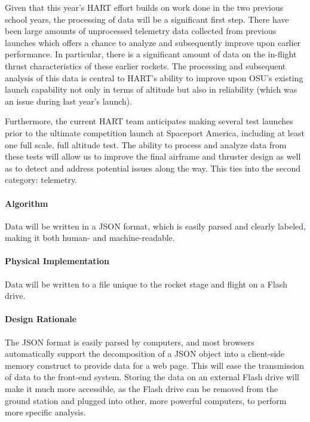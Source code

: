 \documentclass[journal,10pt,onecolumn,compsoc]{IEEEtran}
\begin{document}
			\noindent Given that this year's HART effort builds on work done in the two previous school years, the processing of data will be a significant first step. 
			There have been large amounts of unprocessed telemetry data collected from previous launches which offers a chance to analyze and subsequently improve upon earlier performance. 
			In particular, there is a significant amount of data on the in-flight thrust characteristics of these earlier rockets. 
			The processing and subsequent analysis of this data is central to HART's ability to improve upon OSU's existing launch capability not only in terms of altitude but also in reliability (which was an issue during last year's launch).

			\noindent Furthermore, the current HART team anticipates making several test launches prior to the ultimate competition launch at Spaceport America, including at least one full scale, full altitude test. 
			The ability to process and analyze data from these tests will allow us to improve the final airframe and thruster design as well as to detect and address potential issues along the way. 
			This ties into the second category: telemetry.


			\paragraph{Algorithm}
				\noindent Data will be written in a JSON format, which is easily parsed and clearly labeled, making it both human- and machine-readable.

			\paragraph{Physical Implementation}
				\noindent Data will be written to a file unique to the rocket stage and flight on a Flash drive.

			\paragraph{Design Rationale}
				\noindent The JSON format is easily parsed by computers, and most browsers automatically support the decomposition of a JSON object into a client-side memory construct to provide data for a web page.
				This will ease the transmission of data to the front-end system.
				Storing the data on an external Flash drive will make it much more accessible, as the Flash drive can be removed from the ground station and plugged into other, more powerful computers, to perform more specific analysis.
\end{document}
